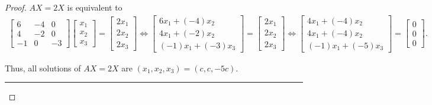 \begin{proof}
    $AX = 2X$ is equivalent to
    \begin{align*}
        \begin{bmatrix}
            6  & -4 & 0  \\
            4  & -2 & 0  \\
            -1 & 0  & -3
        \end{bmatrix}
        \begin{bmatrix}
            x_{1} \\ x_{2} \\ x_{3}
        \end{bmatrix}
        =
        \begin{bmatrix}
            2x_{1} \\ 2x_{2} \\ 2x_{3}
        \end{bmatrix}
        \Longleftrightarrow
        \begin{bmatrix}
            6x_{1} + (-4)x_{2} \\ 4x_{1} + (-2)x_{2} \\ (-1)x_{1} + (-3)x_{3}
        \end{bmatrix}
        =
        \begin{bmatrix}
            2x_{1} \\ 2x_{2} \\ 2x_{3}
        \end{bmatrix}
        \Longleftrightarrow
        \begin{bmatrix}
            4x_{1} + (-4)x_{2} \\
            4x_{1} + (-4)x_{2} \\
            (-1)x_{1} + (-5)x_{3}
        \end{bmatrix}
        =
        \begin{bmatrix}
            0 \\ 0 \\ 0
        \end{bmatrix}.
    \end{align*}

    Thus, all solutions of $AX = 2X$ are $(x_{1}, x_{2}, x_{3}) = (c, c, -5c)$.

    \bigskip\hrule\bigskip


\end{proof}
